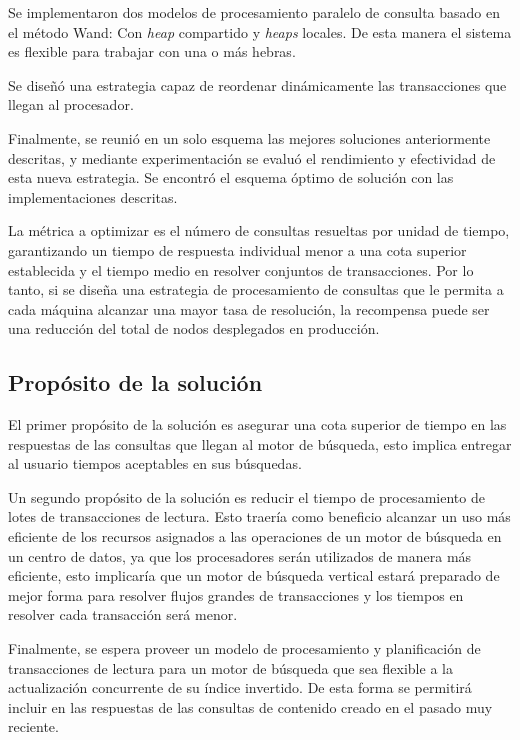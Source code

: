 Se implementaron dos modelos de procesamiento paralelo de consulta basado en el método Wand: Con \textit{heap} compartido y \textit{heaps} locales. De esta manera el sistema es flexible para trabajar con una o más hebras.

Se diseñó una estrategia capaz de reordenar dinámicamente las transacciones que llegan al procesador. 

Finalmente, se reunió en un solo esquema las mejores soluciones anteriormente descritas, y mediante experimentación se evaluó el rendimiento y efectividad de esta nueva estrategia. Se encontró el esquema óptimo de solución con las implementaciones descritas.

La métrica a optimizar es el número de consultas resueltas por unidad de tiempo, garantizando un tiempo de respuesta individual menor a una cota superior establecida y el tiempo medio en resolver conjuntos de transacciones. Por lo tanto, si se diseña una estrategia de procesamiento de consultas que le permita a cada máquina alcanzar una mayor tasa de resolución, la recompensa puede ser una reducción del total de nodos desplegados en producción.


\subsection{Prop\'osito de la solución}
\label{intro:propositosolucion}

El primer propósito de la solución es asegurar una cota superior de tiempo en las respuestas de las consultas que llegan al motor de búsqueda, esto implica entregar al usuario tiempos aceptables en sus búsquedas.

Un segundo propósito de la solución es reducir el tiempo de procesamiento de lotes de transacciones de lectura. Esto traería como beneficio alcanzar un uso más eficiente de los recursos asignados a las operaciones de un motor de búsqueda en un centro de datos, ya que los procesadores serán utilizados de manera más eficiente, esto implicaría que un motor de búsqueda vertical estará preparado de mejor forma para resolver flujos grandes de transacciones y los tiempos en resolver cada transacción será menor.

Finalmente, se espera proveer un modelo de procesamiento y planificación de transacciones de lectura para un motor de búsqueda que sea flexible a la actualización concurrente de su índice invertido. De esta forma se permitirá incluir en las respuestas de las consultas de contenido creado en el pasado muy reciente.

